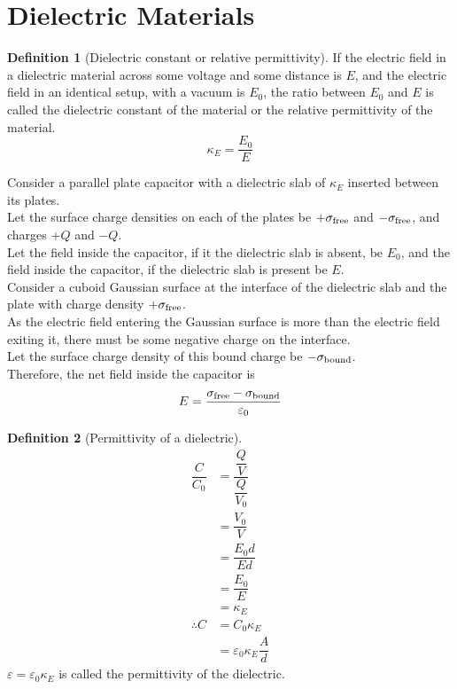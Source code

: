 \documentclass[fleqn, a4paper, 12pt, twoside]{article}
\theoremstyle{definition}
\newtheorem{definition}{Definition}
\theoremstyle{theorem}
\begin{document}
\section{Dielectric Materials}

\begin{definition}[Dielectric constant or relative permittivity]
	If the electric field in a dielectric material across some voltage and some distance is $E$, and the electric field in an identical setup, with a vacuum is $E_0$, the ratio between $E_0$ and $E$ is called the dielectric constant of the material or the relative permittivity of the material.
	\begin{equation*}
		\kappa_E = \dfrac{E_0}{E}
	\end{equation*}
\end{definition}

Consider a parallel plate capacitor with a dielectric slab of $\kappa_E$ inserted between its plates.\\
Let the surface charge densities on each of the plates be $+\sigma_{\textnormal{free}}$ and $-\sigma_{\textnormal{free}}$, and charges $+Q$ and $-Q$.\\
Let the field inside the capacitor, if it the dielectric slab is absent, be $E_0$, and the field inside the capacitor, if the dielectric slab is present be $E$.\\
Consider a cuboid Gaussian surface at the interface of the dielectric slab and the plate with charge density $+\sigma_{\textnormal{free}}$.\\
As the electric field entering the Gaussian surface is more than the electric field exiting it, there must be some negative charge on the interface.\\
Let the surface charge density of this bound charge be $-\sigma_{\textnormal{bound}}$.\\
Therefore, the net field inside the capacitor is
\begin{equation*}
	E = \dfrac{\sigma_{\textnormal{free}} - \sigma_{\textnormal{bound}}}{\varepsilon_0}
\end{equation*}

\begin{definition}[Permittivity of a dielectric]
	\begin{align*}
		\dfrac{C}{C_0} & = \dfrac{\dfrac{Q}{V}}{\dfrac{Q}{V_0}} \\
                               & = \dfrac{V_0}{V}                       \\
                               & = \dfrac{E_0 d}{E d}                   \\
                               & = \dfrac{E_0}{E}                       \\
                               & = \kappa_E                             \\
		\therefore C   & = C_0 \kappa_E                         \\
                               & = \varepsilon_0 \kappa_E \dfrac{A}{d}
	\end{align*}
	$\varepsilon = \varepsilon_0 \kappa_E$ is called the permittivity of the dielectric.
\end{definition}
\end{document}
